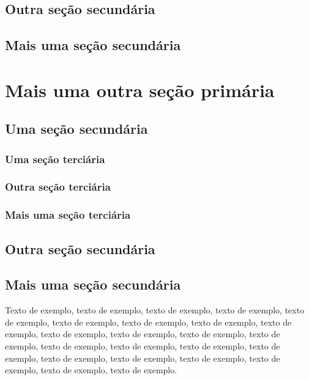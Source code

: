 \documentclass[
	12pt,				%
	oneside,			%
	a4paper,			%
	english,			%
	brazil				%
	]{abntex2ppgsi}
\begin{document}
\section{Outra seção secundária}


\section{Mais uma seção secundária}


\chapter{Mais uma outra seção primária}


\section{Uma seção secundária}


\subsection{Uma seção terciária}



\subsection{Outra seção terciária}

\subsection{Mais uma seção terciária}



\section{Outra seção secundária}


\section{Mais uma seção secundária}

Texto de exemplo, texto de exemplo, texto de exemplo, texto de exemplo, texto de exemplo, texto de exemplo, texto de exemplo, texto de exemplo, texto de exemplo, texto de exemplo, texto de exemplo, texto de exemplo, texto de exemplo, texto de exemplo, texto de exemplo, texto de exemplo, texto de exemplo, texto de exemplo, texto de exemplo, texto de exemplo, texto de exemplo, texto de exemplo, texto de exemplo.
\end{document}
